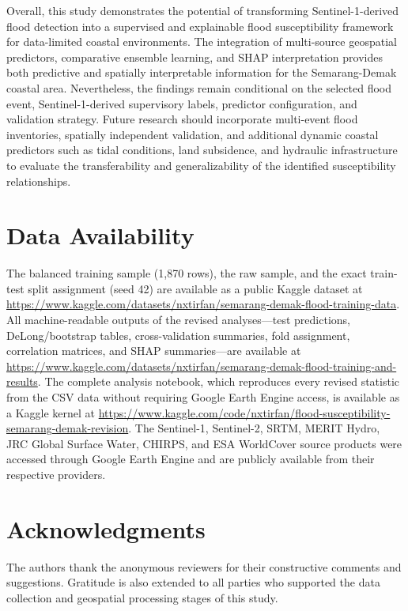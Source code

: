 \documentclass[11pt,twoside]{article}
\newcommand{\acknowledg}[1]{
\section*{Acknowledgments}
#1
}
\begin{document}
Overall, this study demonstrates the potential of transforming Sentinel-1-derived flood detection into a supervised and explainable flood susceptibility framework for data-limited coastal environments. The integration of multi-source geospatial predictors, comparative ensemble learning, and SHAP interpretation provides both predictive and spatially interpretable information for the Semarang-Demak coastal area. Nevertheless, the findings remain conditional on the selected flood event, Sentinel-1-derived supervisory labels, predictor configuration, and validation strategy. Future research should incorporate multi-event flood inventories, spatially independent validation, and additional dynamic coastal predictors such as tidal conditions, land subsidence, and hydraulic infrastructure to evaluate the transferability and generalizability of the identified susceptibility relationships.
 
\section*{Data Availability}
The balanced training sample (1,870 rows), the raw sample, and the exact train-test split assignment (seed 42) are available as a public Kaggle dataset at \url{https://www.kaggle.com/datasets/nxtirfan/semarang-demak-flood-training-data}. All machine-readable outputs of the revised analyses---test predictions, DeLong/bootstrap tables, cross-validation summaries, fold assignment, correlation matrices, and SHAP summaries---are available at \url{https://www.kaggle.com/datasets/nxtirfan/semarang-demak-flood-training-and-results}. The complete analysis notebook, which reproduces every revised statistic from the CSV data without requiring Google Earth Engine access, is available as a Kaggle kernel at \url{https://www.kaggle.com/code/nxtirfan/flood-susceptibility-semarang-demak-revision}. The Sentinel-1, Sentinel-2, SRTM, MERIT Hydro, JRC Global Surface Water, CHIRPS, and ESA WorldCover source products were accessed through Google Earth Engine and are publicly available from their respective providers.
 
\acknowledg{The authors thank the anonymous reviewers for their constructive
comments and suggestions. Gratitude is also extended to all parties who supported
the data collection and geospatial processing stages of this study.}
 
\FloatBarrier
\printbibliography
 
\end{document}
